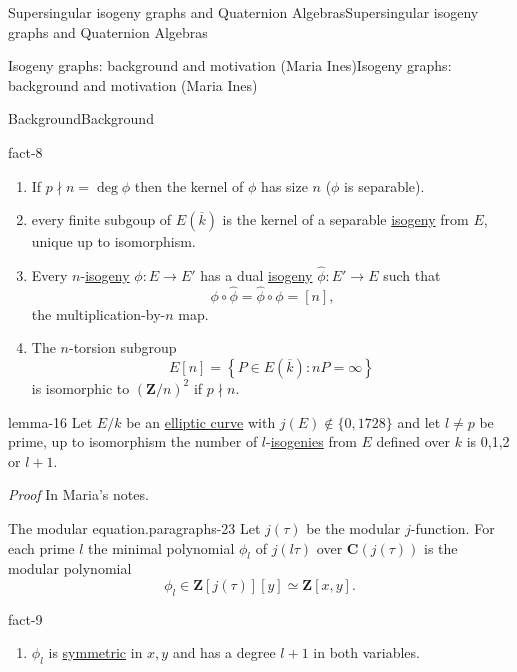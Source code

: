 \documentclass[10pt,]{book}
\makeatletter
\renewcommand*{\proofname}{Proof}
\renewenvironment{proof}[1][\proofname]{\par
  \pushQED{\qed}%
  \normalfont \topsep6\p@\@plus6\p@\relax
  \trivlist
  \item\relax
    {\itshape
    #1\@addpunct{.}}\hspace\labelsep\ignorespaces
}{%
  \popQED\endtrivlist\@endpefalse
}
\numberwithin{equation}{section}
\newcommand{\lb}{[}
\newcommand{\rb}{]}
\newcommand{\ZZ}{\mathbf{Z}}
\newcommand{\CC}{\mathbf{C}}
\makeatother
\begin{document}
\begin{chapterptx}{Supersingular isogeny graphs and Quaternion Algebras}{}{Supersingular isogeny graphs and Quaternion Algebras}{}{}
\begin{sectionptx}{Isogeny graphs: background and motivation (Maria Ines)}{}{Isogeny graphs: background and motivation (Maria Ines)}{}{}
\begin{subsectionptx}{Background}{}{Background}{}{}
\begin{fact}{}{}{fact-8}
\begin{enumerate}
\item\hypertarget{li-184}{}If \(p \nmid n = \deg \phi\) then the kernel of \(\phi\) has size \(n\) (\(\phi\) is separable).%
\item\hypertarget{li-185}{}every finite subgoup of \(E(\overline k )\) is the kernel of a separable \hyperref[def-supersing-isog-isog]{isogeny} from \(E\), unique up to isomorphism.%
\item\hypertarget{li-186}{}Every \(n\)-\hyperref[def-supersing-isog-isog]{isogeny} \(\phi\colon E \to E'\) has  a dual \hyperref[def-supersing-isog-isog]{isogeny} \(\hat \phi \colon E' \to E\) such that%
\begin{equation*}
\phi\circ \hat\phi = \hat\phi \circ \phi = \lb n \rb\text{,}
\end{equation*}
the multiplication-by-\(n \) map.%
\item\hypertarget{li-187}{}The \(n\)-torsion subgroup%
\begin{equation*}
E\lb n \rb = \left\{ P \in E(\overline k) : nP = \infty\right\}
\end{equation*}
is isomorphic to \((\ZZ/n)^2\) if \(p\nmid n\).%
\end{enumerate}
%
\end{fact}
\begin{lemma}{}{}{lemma-16}%
\hypertarget{p-793}{}%
Let \(E/k\) be an \hyperref[def-supersing-isog-ec]{elliptic curve} with \(j(E) \not\in\{0,1728\}\) and let \(l\ne p\) be prime, up to isomorphism the number of \(l\)-\hyperref[def-supersing-isog-isog]{isogenies} from \(E\) defined over \(k\) is 0,1,2 or \(l+1\).%
\end{lemma}
\begin{proof}\hypertarget{proof-104}{}
\hypertarget{p-794}{}%
In Maria's notes.%
\end{proof}
\begin{paragraphs}{The modular equation.}{paragraphs-23}%
\hypertarget{p-795}{}%
Let \(j(\tau)\) be the modular \(j\)-function. For each prime \(l\) the minimal polynomial \(\phi_l\) of \(j(l\tau)\) over \(\CC (j(\tau))\) is the modular polynomial%
\begin{equation*}
\phi_l \in \ZZ[j(\tau)][y] \simeq \ZZ[x,y]\text{.}
\end{equation*}
%
\begin{fact}{}{}{fact-9}%
\hypertarget{p-796}{}%
\leavevmode%
\begin{enumerate}
\item\hypertarget{li-188}{}\(\phi_l\) is \hyperref[def-princ-pol]{symmetric} in \(x,y\) and has a degree \(l+1\) in both variables.%

\end{enumerate}
\end{fact}
\end{paragraphs}
\end{subsectionptx}
\end{sectionptx}
\end{chapterptx}
\end{document}
